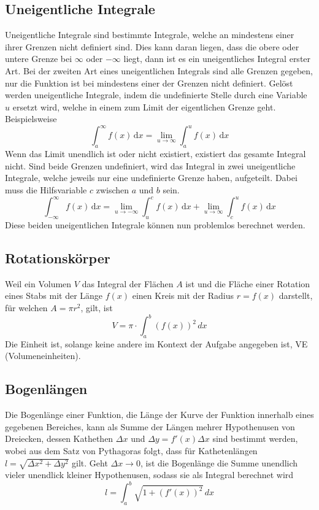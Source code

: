 \documentclass{article}
\begin{document}
\subsection{Uneigentliche Integrale}
Uneigentliche Integrale sind bestimmte Integrale, welche an mindestens einer ihrer Grenzen nicht definiert sind. Dies kann daran liegen, dass die obere oder untere Grenze bei $\infty$ oder $-\infty$ liegt, dann ist es ein uneigentliches Integral erster Art. Bei der zweiten Art eines uneigentlichen Integrals sind alle Grenzen gegeben, nur die Funktion ist bei mindestens einer der Grenzen nicht definiert. \newline
Gelöst werden uneigentliche Integrale, indem die undefinierte Stelle durch eine Variable $u$ ersetzt wird, welche in einem zum Limit der eigentlichen Grenze geht. Beispielsweise
\[
 \int_a^\infty f(x)\,\mathrm{d}x =
 \lim_{u \to \infty} \int_a^u f(x)\,\mathrm{d}x
\]
Wenn das Limit unendlich ist oder nicht existiert, existiert das gesamte Integral nicht. \newline 
Sind beide Grenzen undefiniert, wird das Integral in zwei uneigentliche Integrale, welche jeweils nur eine undefinierte Grenze haben, aufgeteilt. Dabei muss die Hilfsvariable $c$ zwischen $a$ und $b$ sein.
\[
 \int_{-\infty}^\infty f(x)\,\mathrm{d}x =
 \lim_{u \to -\infty} \int_u^c f(x)\,\mathrm{d}x + 
 \lim_{u \to \infty} \int_c^u f(x)\,\mathrm{d}x
\]
Diese beiden uneigentlichen Integrale können nun problemlos berechnet werden.  
 
\subsection{Rotationskörper}
Weil ein Volumen $V$ das Integral der Flächen $A$ ist und die Fläche einer Rotation eines Stabs mit der Länge $f(x)$ einen Kreis mit der Radius $r=f(x)$ darstellt, für welchen $A=\pi r^2$, gilt, ist
\[V = \pi \cdot \int_a^b (f(x))^2 \, dx\]
Die Einheit ist, solange keine andere im Kontext der Aufgabe angegeben ist, VE (Volumeneinheiten). 
  
\subsection{Bogenlängen}
Die Bogenlänge einer Funktion, die Länge der Kurve der Funktion innerhalb eines gegebenen Bereiches, kann als Summe der Längen mehrer Hypothenusen von Dreiecken, dessen Kathethen $\Delta x$ und $\Delta y = f'(x) \Delta x$ sind bestimmt werden, wobei aus dem Satz von Pythagoras folgt, dass für Kathetenlängen $l = \sqrt{\Delta x^2 + \Delta y^2}$ gilt.
Geht $\Delta x \to 0$, ist die Bogenlänge die Summe unendlich vieler unendlick kleiner Hypothenusen, sodass sie als Integral berechnet wird
\[l = \int_a^b \sqrt{1+(f'(x))^2} \, dx\]   
 
\end{document}
